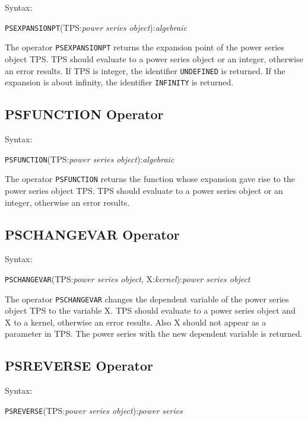 Syntax:

\hspace*{2em}
{\tt PSEXPANSIONPT}(TPS:{\em power series object}):{\em algebraic}

The operator {\tt PSEXPANSIONPT} returns the expansion point of the
power series object TPS. TPS should evaluate to a power
series object or an integer, otherwise an error results. If TPS
is integer, the identifier {\tt UNDEFINED} is returned. If the
expansion is about infinity, the identifier {\tt INFINITY} is
returned.

\subsection{PSFUNCTION Operator}

Syntax:

\hspace*{2em}
{\tt PSFUNCTION}(TPS:{\em power series object}):{\em algebraic}

The operator {\tt PSFUNCTION} returns the function whose expansion
gave rise to the power series object TPS. TPS should
evaluate to a power series object or an integer, otherwise an error
results.

\subsection{PSCHANGEVAR Operator}

Syntax:

\hspace*{2em} {\tt PSCHANGEVAR}(TPS:{\em power series object},
X:{\em kernel}):{\em power series object}

The operator {\tt PSCHANGEVAR} changes the dependent variable of the
power series object TPS to the variable X. TPS
should evaluate to a power series object and X to a kernel,
otherwise an error results.  Also X should not appear as a
parameter in TPS. The power series with the new dependent
variable is returned.

\subsection{PSREVERSE Operator}

Syntax:

\hspace*{2em}
{\tt PSREVERSE}(TPS:{\em power series object}):{\em power series}

